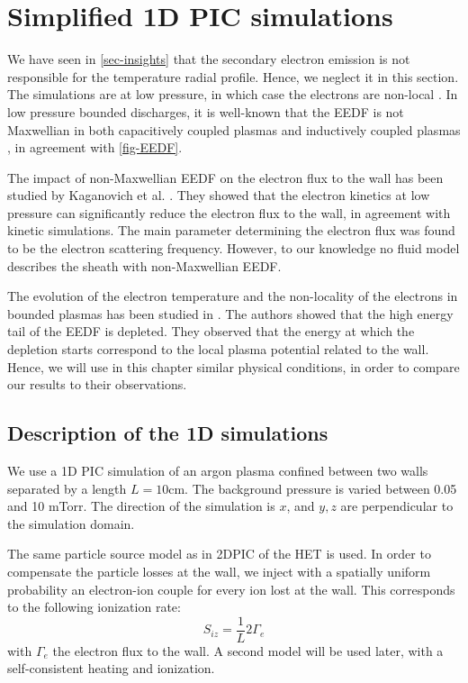 
\section{Simplified 1D PIC simulations}
  \label{sec-1DPIC}

  We have seen in \cref{sec-insights} that the secondary electron emission is not responsible for the temperature radial profile.
  Hence, we neglect it in this section.
  The simulations are at low pressure, in which case  the electrons are non-local \cite{bernstein1954, godyak1993}.
  In low pressure bounded discharges, it is well-known that the EEDF is not Maxwellian in both capacitively coupled plasmas and inductively coupled plasmas \cite{mouchtouris2016, godyak2002, meige2006a, dominguez-vazquez2018}, in agreement with \cref{fig-EEDF}.

  The impact of non-Maxwellian EEDF on the electron flux to the wall has been studied by Kaganovich et al. \citep{kaganovich2000,kaganovich2007}.
  They showed that the electron kinetics at low pressure can significantly reduce the electron flux to the wall, in agreement with kinetic simulations.
  The main parameter determining the electron flux was found to be the electron scattering frequency.
  However, to our knowledge no fluid model describes the sheath with non-Maxwellian EEDF.

  The evolution of the electron temperature and the non-locality of the electrons in bounded plasmas has been studied in \citet{meige2006a}.
  The authors showed that the high energy tail of the \ac{EEDF} is depleted.
  They observed that the energy at which the depletion starts correspond to the local plasma potential related to the wall.
  Hence, we will use in this chapter similar physical conditions, in order to compare our results to their observations.

  \subsection{Description of the \acs{1D} simulations}

    We use a 1D PIC simulation of an argon plasma confined between two walls separated by a length $L=10$cm.
    The background pressure is varied between 0.05 and 10 mTorr.
    The direction of the simulation is $x$, and $y,z$ are perpendicular to the simulation domain.

    The same particle source model as in \ac{2D}\ac{PIC} of the \ac{HET} is used.
    In order to compensate the particle losses at the wall, we inject with a spatially uniform probability an electron-ion couple for every ion lost at the wall.
    This corresponds to the following ionization rate:
    \begin{equation}
      S_{iz} = \frac{1}{L} 2 \Gamma_e
    \end{equation}
    with $\Gamma_e$ the electron flux to the wall.
    A second model will be used later, with a self-consistent heating and ionization.

